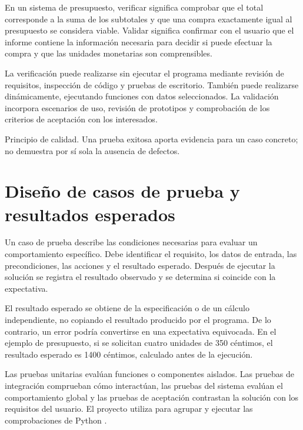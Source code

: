 En un sistema de presupuesto, verificar significa comprobar que el total corresponde a la suma de los subtotales y que una compra exactamente igual al presupuesto se considera viable. Validar significa confirmar con el usuario que el informe contiene la información necesaria para decidir si puede efectuar la compra y que las unidades monetarias son comprensibles.

La verificación puede realizarse sin ejecutar el programa mediante revisión de requisitos, inspección de código y pruebas de escritorio. También puede realizarse dinámicamente, ejecutando funciones con datos seleccionados. La validación incorpora escenarios de uso, revisión de prototipos y comprobación de los criterios de aceptación con los interesados.



Principio de calidad. Una prueba exitosa aporta evidencia para un caso concreto; no demuestra por sí sola la ausencia de defectos.

\section{Diseño de casos de prueba y resultados esperados}

Un caso de prueba describe las condiciones necesarias para evaluar un comportamiento específico. Debe identificar el requisito, los datos de entrada, las precondiciones, las acciones y el resultado esperado. Después de ejecutar la solución se registra el resultado observado y se determina si coincide con la expectativa.

El resultado esperado se obtiene de la especificación o de un cálculo independiente, no copiando el resultado producido por el programa. De lo contrario, un error podría convertirse en una expectativa equivocada. En el ejemplo de presupuesto, si se solicitan cuatro unidades de 350 céntimos, el resultado esperado es 1400 céntimos, calculado antes de la ejecución.

Las pruebas unitarias evalúan funciones o componentes aislados. Las pruebas de integración comprueban cómo interactúan, las pruebas del sistema evalúan el comportamiento global y las pruebas de aceptación contrastan la solución con los requisitos del usuario. El proyecto utiliza  para agrupar y ejecutar las comprobaciones de Python \parencite{python312unittest}.




